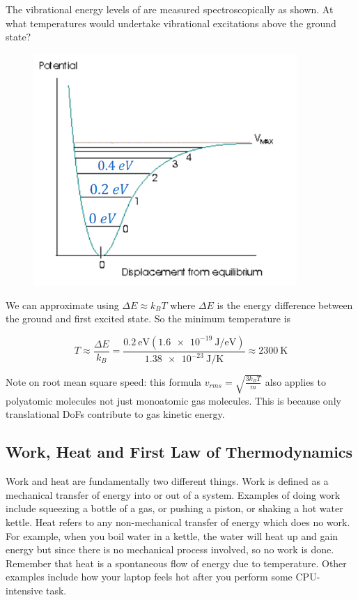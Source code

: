 \begin{texample}
	The vibrational energy levels of  are measured spectroscopically as shown. At what temperatures would  undertake vibrational excitations above the ground state?
	
	\begin{figure}[H]
		\centering
		\includegraphics[width=100mm]{21.png}
	\end{figure}
	
	We can approximate using $\Delta E \approx k_BT$ where $\Delta E$ is the energy difference between the ground and first excited state. So the minimum temperature is
	
	$$T\approx\frac{\Delta E}{k_B}=\frac{\SI{0.2}{\electronvolt} (\SI{1.6e-19}{\joule\per\electronvolt})}{\SI{1.38e-23}{\joule\per\kelvin}}\approx\SI{2300}{\kelvin}$$
\end{texample}

Note on root mean square speed: this formula $v_{rms}=\sqrt{\frac{3k_BT}{m}}$ also applies to polyatomic molecules not just monoatomic gas molecules. This is because only translational DoFs contribute to gas kinetic energy.

\subsection{Work, Heat and First Law of Thermodynamics}

Work and heat are fundamentally two different things. Work is defined as a mechanical transfer of energy into or out of a system. Examples of doing work include squeezing a bottle of a gas, or pushing a piston, or shaking a hot water kettle. Heat refers to any non-mechanical transfer of energy which does no work. For example, when you boil water in a kettle, the water will heat up and gain energy but since there is no mechanical process involved, so no work is done. Remember that heat is a spontaneous flow of energy due to temperature. Other examples include how your laptop feels hot after you perform some CPU-intensive task. \\

